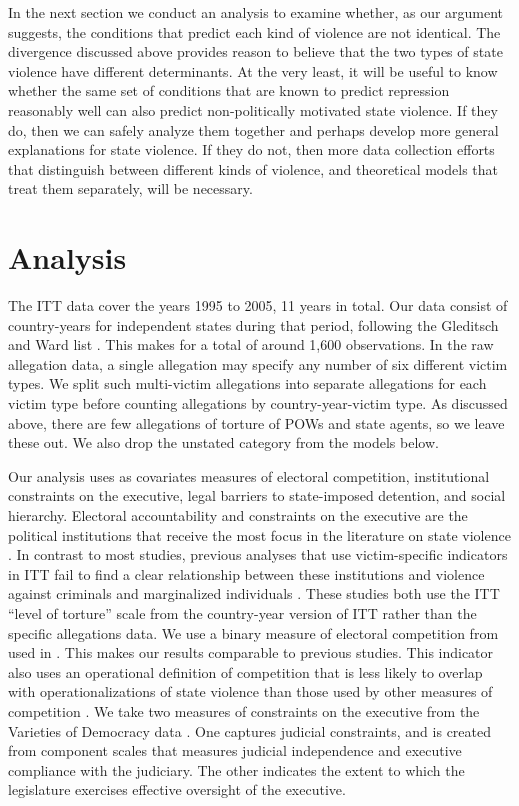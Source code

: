 \documentclass[11pt]{article}
\begin{document}
In the next section we conduct an analysis to examine whether, as our argument suggests, the conditions that predict each kind of violence are not identical. The divergence discussed above provides reason to believe that the two types of state violence have different determinants. At the very least, it will be useful to know whether the same set of conditions that are known to predict repression reasonably well can also predict non-politically motivated state violence. If they do, then we can safely analyze them together and perhaps develop more general explanations for state violence. If they do not, then more data collection efforts that distinguish between different kinds of violence, and theoretical models that treat them separately, will be necessary.  

\section*{Analysis}

The ITT data cover the years 1995 to 2005, 11 years in total. Our data consist of country-years for independent states during that period, following the Gleditsch and Ward list \citep{gleditsch:ward:1999}. This makes for a total of around 1,600 observations. In the raw allegation data, a single allegation may specify any number of six different victim types. We split such multi-victim allegations into separate allegations for each victim type before counting allegations by country-year-victim type. As discussed above, there are few allegations of torture of POWs and state agents, so we leave these out. We also drop the unstated category from the models below. 

Our analysis uses as covariates measures of electoral competition, institutional constraints on the executive, legal barriers to state-imposed detention, and social hierarchy. Electoral accountability and constraints on the executive are the political institutions that receive the most focus in the literature on state violence \citep[E.g.,][]{Davenport2007}. In contrast to most studies, previous analyses that use victim-specific indicators in ITT fail to find a clear relationship between these institutions and violence against criminals and marginalized individuals \citep{Haschke2018,JacksonHillHall2018}. These studies both use the ITT ``level of torture'' scale from the country-year version of ITT \citep{conrad2013disaggregating} rather than the specific allegations data. We use a binary measure of electoral competition from \citet{cheibub2010democracy} used in \citep{Haschke2018,JacksonHillHall2018}. This makes our results comparable to previous studies. This indicator also uses an operational definition of competition that is less likely to overlap with operationalizations of state violence than those used by other measures of competition \citep[See][]{Hill2016}. We take two measures of constraints on the executive from the Varieties of Democracy data \citep{Vdem}. One captures judicial constraints, and is created from component scales that measures judicial independence and executive compliance with the judiciary. The other indicates the extent to which the legislature exercises effective oversight of the executive. 
\end{document}
